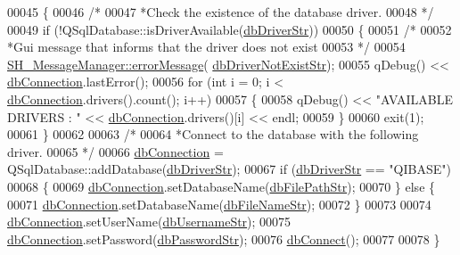 \begin{DoxyCode}
00045 \{
00046     \textcolor{comment}{/*}
00047 \textcolor{comment}{     *Check the existence of the database driver.
}
00048 \textcolor{comment}{     */}
00049     \textcolor{keywordflow}{if} (!QSqlDatabase::isDriverAvailable(\hyperlink{SH__DatabaseManager_8h_a867ada6d1926e2ded0e68678e02a19c7}{dbDriverStr}))
00050     \{
00051         \textcolor{comment}{/*}
00052 \textcolor{comment}{        *Gui message that informs that the driver does not exist
}
00053 \textcolor{comment}{        */}
00054         \hyperlink{classSH__MessageManager_acb5615cc90f198f4768da800a5d32362}{SH\_MessageManager::errorMessage}(
      \hyperlink{SH__DatabaseManager_8h_adeeb3449586b533bdd3cd5938d501807}{dbDriverNotExistStr});
00055         qDebug() << \hyperlink{classSH__DatabaseManager_a9291f61c3abbba2c4f1567b1d8325f0e}{dbConnection}.lastError();
00056         \textcolor{keywordflow}{for} (\textcolor{keywordtype}{int} i = 0; i < \hyperlink{classSH__DatabaseManager_a9291f61c3abbba2c4f1567b1d8325f0e}{dbConnection}.drivers().count(); i++)
00057         \{
00058             qDebug() << \textcolor{stringliteral}{"AVAILABLE DRIVERS : "} << \hyperlink{classSH__DatabaseManager_a9291f61c3abbba2c4f1567b1d8325f0e}{dbConnection}.drivers()[i] << endl;
00059         \}
00060         exit(1);
00061     \}
00062 
00063     \textcolor{comment}{/*}
00064 \textcolor{comment}{    *Connect to the database with the following driver.
}
00065 \textcolor{comment}{    */}
00066     \hyperlink{classSH__DatabaseManager_a9291f61c3abbba2c4f1567b1d8325f0e}{dbConnection} = QSqlDatabase::addDatabase(\hyperlink{SH__DatabaseManager_8h_a867ada6d1926e2ded0e68678e02a19c7}{dbDriverStr});
00067     \textcolor{keywordflow}{if} (\hyperlink{SH__DatabaseManager_8h_a867ada6d1926e2ded0e68678e02a19c7}{dbDriverStr} == \textcolor{stringliteral}{"QIBASE"})
00068     \{
00069         \hyperlink{classSH__DatabaseManager_a9291f61c3abbba2c4f1567b1d8325f0e}{dbConnection}.setDatabaseName(\hyperlink{SH__DatabaseManager_8h_acee79beb6e5aec996fd46b84264d072a}{dbFilePathStr});
00070     \} \textcolor{keywordflow}{else} \{
00071         \hyperlink{classSH__DatabaseManager_a9291f61c3abbba2c4f1567b1d8325f0e}{dbConnection}.setDatabaseName(\hyperlink{SH__DatabaseManager_8h_a6c6a636455d1d86d7215a52de4bc6828}{dbFileNameStr});
00072     \}
00073 
00074     \hyperlink{classSH__DatabaseManager_a9291f61c3abbba2c4f1567b1d8325f0e}{dbConnection}.setUserName(\hyperlink{SH__DatabaseManager_8h_a15964752bd7d7c2075f3bafca2218411}{dbUsernameStr});
00075     \hyperlink{classSH__DatabaseManager_a9291f61c3abbba2c4f1567b1d8325f0e}{dbConnection}.setPassword(\hyperlink{SH__DatabaseManager_8h_a5dbd4602b69f5a87243d49f9c873ac64}{dbPasswordStr});
00076     \hyperlink{classSH__DatabaseManager_aeb077fe5437f435c0cbe8d77d96dd846}{dbConnect}();
00077 
00078 \}
\end{DoxyCode}


